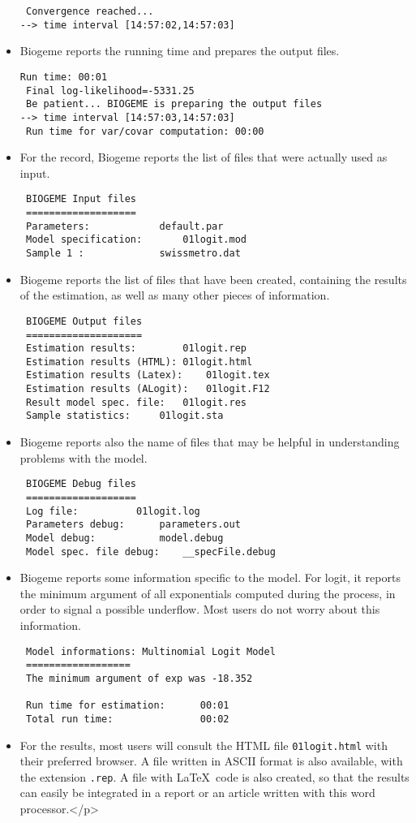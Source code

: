 \documentclass[12pt]{memoir}
\begin{document}
\begin{itemize}
{\begin{verbatim}
 Convergence reached...
--> time interval [14:57:02,14:57:03]
\end{verbatim}
}
\item Biogeme reports the running time and prepares the output files.
{\footnotesize
\begin{verbatim}
Run time: 00:01
 Final log-likelihood=-5331.25
 Be patient... BIOGEME is preparing the output files
--> time interval [14:57:03,14:57:03]
 Run time for var/covar computation: 00:00
\end{verbatim}
}
\item For the record, Biogeme reports the list of files that were actually used as
input.
{\footnotesize
\begin{verbatim}
 BIOGEME Input files
 ===================
 Parameters:			default.par
 Model specification:		01logit.mod
 Sample 1 :				swissmetro.dat
\end{verbatim}
}
\item  Biogeme reports the list of files that have been created,
containing the results of the estimation, as well as many other pieces
of information.

{\footnotesize
\begin{verbatim}
 BIOGEME Output files
 ====================
 Estimation results:		01logit.rep
 Estimation results (HTML):	01logit.html
 Estimation results (Latex):	01logit.tex
 Estimation results (ALogit):	01logit.F12
 Result model spec. file:	01logit.res
 Sample statistics:		01logit.sta
\end{verbatim}
}
\item  Biogeme reports also the name of files that may be helpful in
understanding problems with the model.
{\footnotesize
\begin{verbatim}
 BIOGEME Debug files
 ===================
 Log file:			01logit.log
 Parameters debug:		parameters.out
 Model debug:			model.debug
 Model spec. file debug:	__specFile.debug
\end{verbatim}
}
\item Biogeme reports some information specific to the
model. For logit, it reports the minimum argument of all exponentials
computed during the process, in order to signal a possible
underflow. Most users do not worry about this information.
{\footnotesize
\begin{verbatim}
 Model informations: Multinomial Logit Model
 ==================
 The minimum argument of exp was -18.352

 Run time for estimation:      00:01
 Total run time:               00:02
\end{verbatim}
}

\item For the results, most users will consult the HTML file \texttt{01logit.html} with their
preferred browser.  A file written in ASCII format is also available,
with the extension \texttt{.rep}. A file with \LaTeX\ code is also
created, so that the results can easily be integrated in a report or
an article written with this word processor.</p>
\end{itemize}
\end{document}
